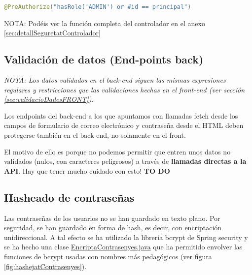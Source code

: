 \documentclass[a4paper,12pt]{report}
\begin{document}
\begin{lstlisting}[language=java, basicstyle=\ttfamily\footnotesize, keywordstyle=\color{magenta}]
	@PreAuthorize("hasRole('ADMIN') or #id == principal")
\end{lstlisting}

	NOTA: Podéis ver la función completa del controlador en el anexo \ref{sec:detallSeguretatControlador}
	
	
		
		

		
		
			\subsection{Validación de datos (End-points back)}
			\label{sec:validacioDadesBACK}
			
			\textit{NOTA: Los datos validados en el back-end siguen las mismas expresiones regulares y restricciones que las validaciones hechas en el front-end (ver sección \ref{sec:validacioDadesFRONT}).}
			
			Los endpoints del back-end a los que apuntamos con llamadas fetch desde los campos de formulario de correo electrónico y contraseña desde el HTML deben protegerse también en el back-end, no solamente en el front.
			
			El motivo de ello es porque no podemos permitir que entren unos datos no validados (nulos, con caracteres peligrosos) a través de \textbf{llamadas directas a la API}. Hay que tener mucho cuidado con esto! \textbf{	TO DO }
			
		
			

			\subsection{Hasheado de contraseñas}
			\label{sec:implementacioHashContra}
			
			Las contraseñas de los usuarios no se han guardado en texto plano. Por seguridad, se han guardado en forma de hash, es decir, con encriptación unidireccional. A tal efecto se ha utilizado la librería bcrypt de Spring security\cite{bcryptPasswordEncoder} y se ha hecho una clase \href{https://github.com/blackcub3s/mercApp/blob/main/APP%20WEB/__springboot__produccio__/app/src/main/java/miApp/app/utils/EncriptaContrasenyes.java}{EncriptaContrasenyes.java} que ha permitido envolver las funciones de bcrypt usadas con nombres más pedagógicos (ver figura \ref{fig:hashejatContrasenyes}).
			
\end{document}
